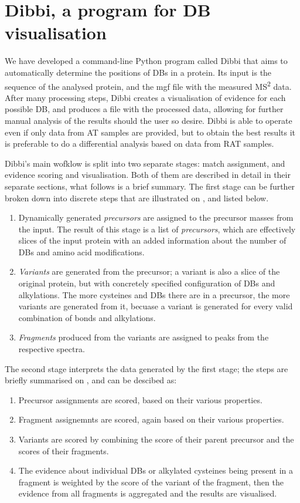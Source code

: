 \section{Dibbi, a program for DB visualisation}

We have developed a command-line Python program called Dibbi that aims to automatically determine the positions of DBs in a protein. Its input is the sequence of the analysed protein, and the mgf file with the measured MS\textsuperscript{2} data. After many processing steps, Dibbi creates a visualisation of evidence for each possible DB, and produces a file with the processed data, allowing for further manual analysis of the results should the user so desire. Dibbi is able to operate even if only data from AT samples are provided, but to obtain the best results it is preferable to do a differential analysis based on data from RAT samples.

Dibbi's main wofklow is split into two separate stages: match assignment, and evidence scoring and visualisation. Both of them are described in detail in their separate sections, what follows is a brief summary. The first stage can be further broken down into discrete steps that are illustrated on , and listed below.

\begin{enumerate}
	\item Dynamically generated \emph{precursors} are assigned to the precursor masses from the input. The result of this stage is a list of \emph{precursors}, which are effectively slices of the input protein with an added information about the number of DBs and amino acid modifications.
	\item \emph{Variants} are generated from the precursor; a variant is also a slice of the original protein, but with concretely specified configuration of DBs and alkylations. The more cysteines and DBs there are in a precursor, the more variants are generated from it, becuase a variant is generated for every valid combination of bonds and alkylations.
	\item \emph{Fragments} produced from the variants are assigned to peaks from the respective spectra.
\end{enumerate}

The second stage interprets the data generated by the first stage; the steps are briefly summarised on , and can be descibed as:

\begin{enumerate}
	\item Precursor assignments are scored, based on their various properties.
	\item Fragment assignemnts are scored, again based on their various properties.
	\item Variants are scored by combining the score of their parent precursor and the scores of their fragments.
	\item The evidence about individual DBs or alkylated cysteines being present in a fragment is weighted by the score of the variant of the fragment, then the evidence from all fragments is aggregated and the results are visualised.
\end{enumerate}


